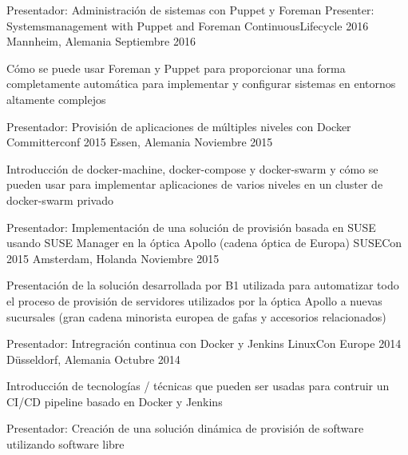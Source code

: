 

\begin{cventries}


  \cventry
    {Presentador: Administración de sistemas con Puppet y Foreman}
    {Presenter: Systemsmanagement with Puppet and Foreman}
    {ContinuousLifecycle 2016}
    {Mannheim, Alemania}
    {Septiembre 2016}
    {
      \begin{cvitems}
        \item {Cómo se puede usar Foreman y Puppet para proporcionar una forma completamente
            automática para implementar y configurar sistemas en entornos altamente complejos}
      \end{cvitems}
    }
  \cventry
    {Presentador: Provisión de aplicaciones de múltiples niveles con Docker}
    {Committerconf 2015}
    {Essen, Alemania}
    {Noviembre 2015}
    {
      \begin{cvitems}
      \item {Introducción de docker-machine, docker-compose y docker-swarm y cómo se pueden usar para implementar aplicaciones de varios niveles en un cluster de docker-swarm privado}
      \end{cvitems}
    }
  \cventry
    {Presentador: Implementación de una solución de provisión basada en SUSE usando SUSE Manager en la óptica Apollo (cadena óptica de Europa) }
    {SUSECon 2015}
    {Amsterdam, Holanda}
    {Noviembre 2015}
    {
      \begin{cvitems}
      \item {Presentación de la solución desarrollada por B1 utilizada para automatizar todo el proceso de provisión de servidores utilizados por la óptica Apollo a nuevas sucursales (gran cadena minorista europea de gafas y accesorios relacionados)}
      \end{cvitems}
    }
  \cventry
    {Presentador: Intregración continua con Docker y Jenkins}
    {LinuxCon Europe 2014} %
    {Düsseldorf, Alemania} %
    {Octubre 2014} %
    {
      \begin{cvitems} %
      \item {Introducción de tecnologías / técnicas que pueden ser usadas para contruir un CI/CD pipeline basado en Docker y Jenkins}
      \end{cvitems}
    }
  \cventry
    {Presentador: Creación de una solución dinámica de provisión de software utilizando software libre}


\end{cventries}
